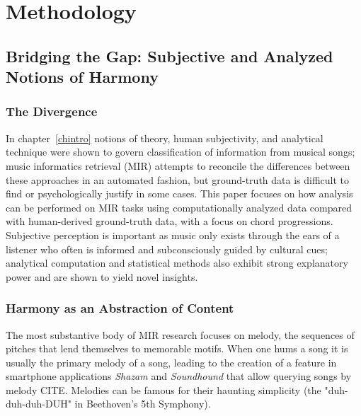 \chapter{Methodology} \label{computationchordextract}

\section{Bridging the Gap: Subjective and Analyzed Notions of Harmony}

\subsection{The Divergence}

In chapter~\ref{chintro} notions of theory, human subjectivity, and analytical technique were shown to govern classification of information from musical songs; music informatics retrieval (MIR) attempts to reconcile the differences between these approaches in an automated fashion, but ground-truth data is difficult to find or psychologically justify in some cases. This paper focuses on how analysis can be performed on MIR tasks using computationally analyzed data compared with human-derived ground-truth data, with a focus on chord progressions. Subjective perception is important as music only exists through the ears of a listener who often is informed and subconsciously guided by cultural cues; analytical computation and statistical methods also exhibit strong explanatory power and are shown to yield novel insights. 


\subsection{Harmony as an Abstraction of Content}

The most substantive body of MIR research focuses on melody, the sequences of pitches that lend themselves to memorable motifs. When one hums a song it is usually the primary melody of a song, leading to the creation of a feature in smartphone applications \textit{Shazam} and \textit{Soundhound} that allow querying songs by melody CITE. Melodies can be famous for their haunting simplicity (the "duh-duh-duh-DUH" in Beethoven's 5th Symphony).

